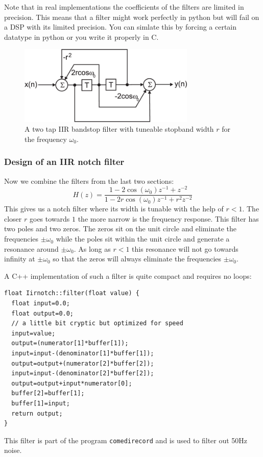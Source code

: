 \documentclass[12pt,a4paper]{article}
\begin{document}
Note that in real implementations the coefficients of the
filters are limited in precision. This means that a filter might
work perfectly in python but will fail on a DSP with its limited
precision. You can simlate this by forcing a certain datatype
in python or you write it properly in C.

\begin{figure}[!hbt]
\begin{center}
\mbox{\includegraphics[width=0.75\textwidth]{iir_fir_stop}}
\end{center}
\caption{A two tap IIR bandstop filter with tuneable stopband width $r$
for the frequency $\omega_0$.
\label{iir_fir_stop}}
\end{figure}

\subsubsection{Design of an IIR notch filter}
Now we combine the filters from the last two sections:
\begin{equation} 
H(z) = \frac {1 - 2 \cos (\omega_{0}) z^{-1} + z^{-2}}{1 - 2r \cos (\omega_{0}) z^{-1} + r^{2} z^{-2}} 
\end{equation}
This gives us a notch filter where its width is tunable with the
help of $r<1$. The closer $r$ goes towards $1$ the more narrow
is the frequency response.
This filter has two poles and two zeros. The zeros sit on the unit
circle and eliminate the frequencies $\pm\omega_0$ while the
poles sit within the unit circle and generate a resonance around
$\pm\omega_0$. As long as $r<1$ this resonance will not go towards
infinity at $\pm\omega_0$ so that the zeros will always eliminate
the frequencies $\pm\omega_0$.

A C++ implementation of such a filter is quite compact and
requires no loops:
\begin{verbatim}
float Iirnotch::filter(float value) {
  float input=0.0;
  float output=0.0;
  // a little bit cryptic but optimized for speed
  input=value;
  output=(numerator[1]*buffer[1]);
  input=input-(denominator[1]*buffer[1]);
  output=output+(numerator[2]*buffer[2]);
  input=input-(denominator[2]*buffer[2]);
  output=output+input*numerator[0];
  buffer[2]=buffer[1];
  buffer[1]=input;
  return output;
}
\end{verbatim}
This filter is part of the program \texttt{comedirecord}
and is used to filter out 50Hz noise.
\end{document}
